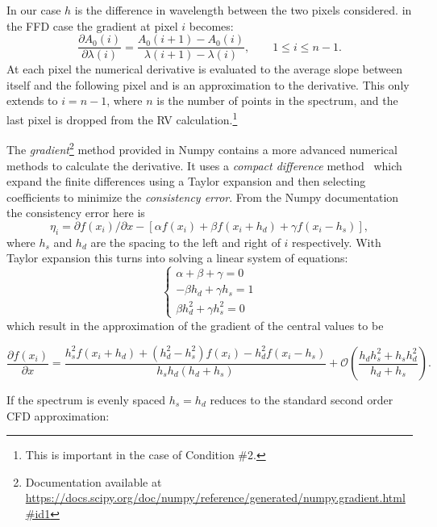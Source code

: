 In our case \(h\) is the difference in wavelength between the two pixels considered. in the FFD case the gradient at pixel \(i\) becomes:
\begin{equation}
\frac{\partial A_0(i)}{\partial\lambda(i)} = \frac{A_0(i+1) - A_0(i)}{\lambda(i+1)-\lambda(i)}, \hspace{2em} 1 \leq i \leq n-1.
\label{eq:ffd_precision}
\end{equation}
At each pixel the numerical derivative is evaluated to the average slope between itself and the following pixel and is an approximation to the derivative. This only extends to \(i= n-1\), where \(n\) is the number of points in the spectrum, and the last pixel is dropped from the RV calculation.\footnote{This is important in the case of Condition \#2.}


The \emph{gradient}\footnote{Documentation available at \href{https://docs.scipy.org/doc/numpy/reference/generated/numpy.gradient.html\#id1 }{https://docs.scipy.org/doc/numpy/reference/generated/numpy.gradient.html\#id1}}  method provided in Numpy contains a more advanced numerical methods to calculate the derivative. It uses a \textit{compact difference} method~\citep{quarteroni_numerical_2000} which expand the finite differences using a Taylor expansion and then selecting coefficients to minimize the \textit{consistency error}.
From the Numpy documentation the consistency error here is \[\eta_i = \partial{f(x_i)}/\partial{x} -  [\alpha f(x_i) + \beta f(x_i +h_d) + \gamma f(x_i - h_s)],\] where \(h_s\) and \(h_d\) are the spacing to the left and right of \(i\) respectively.
With Taylor expansion this turns into solving a linear system of equations:
\[\begin{cases}
         \alpha + \beta + \gamma = 0\\
         -\beta h_d + \gamma h_s = 1\\
         \beta h_d^2 + \gamma h_s^2 = 0
    \end{cases}
\]
which result in the approximation of the gradient of the central values to be

\[\frac{\partial{f(x_i)}}{\partial{x}} = \frac{h_{s}^{2}f\left(x_{i} + h_{d}\right) + \left(h_{d}^{2} - h_{s}^{2}\right)f\left(x_{i}\right) - h_{d}^{2}f\left(x_{i}-h_{s}\right)} {h_{s}h_{d}\left(h_{d} + h_{s}\right)} + \mathcal{O}\left(\frac{h_{d}h_{s}^{2} + h_{s}h_{d}^{2}}{h_{d} + h_{s}}\right) \label{full_compact_difference} .\]

If the spectrum is evenly spaced $h_{s}=h_{d}$  reduces to the standard second order CFD approximation:

